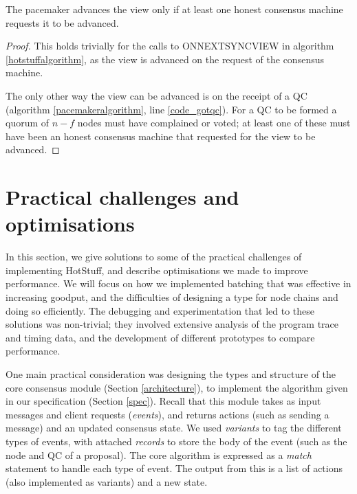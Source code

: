 \begin{theorem} \label{syncvalid}
	The pacemaker advances the view only if at least one honest consensus machine requests it to be advanced.
\end{theorem}

\begin{proof}
	This holds trivially for the calls to ON{\large N}EXT{\large S}YNC{\large V}IEW in algorithm \ref{hotstuffalgorithm}, as the view is advanced on the request of the consensus machine.

	The only other way the view can be advanced is on the receipt of a QC (algorithm \ref{pacemakeralgorithm}, line \ref{code_gotqc}). For a QC to be formed a quorum of $n - f$ nodes must have complained or voted; at least one of these must have been an honest consensus machine that requested for the view to be advanced.
\end{proof}

\section{Practical challenges and optimisations} \label{performance}

In this section, we give solutions to some of the practical challenges of implementing HotStuff, and describe optimisations we made to improve performance. We will focus on how we implemented batching that was effective in increasing goodput, and the difficulties of designing a type for node chains and doing so efficiently. The debugging and experimentation that led to these solutions was non-trivial; they involved extensive analysis of the program trace and timing data, and the development of different prototypes to compare performance.

One main practical consideration was designing the types and structure of the core consensus module (Section \ref{architecture}), to implement the algorithm given in our specification (Section \ref{spec}). Recall that this module takes as input messages and client requests (\textit{events}), and returns actions (such as sending a message) and an updated consensus state. We used \textit{variants} to tag the different types of events, with attached \textit{records} to store the body of the event (such as the node and QC of a proposal). The core algorithm is expressed as a \textit{match} statement to handle each type of event. The output from this is a list of actions (also implemented as variants) and a new state.

